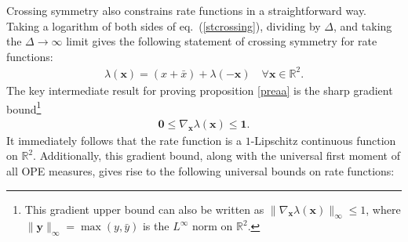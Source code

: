 \documentclass[a4paper,11pt]{article}
\theoremstyle{plain}
\theoremstyle{definition}
\theoremstyle{remark}
\newcommand{\bs}[1]{\boldsymbol{#1}}
\newcommand{\ba}{\begin{equation} \begin{aligned}}
\newcommand{\ea}{\end{aligned} \end{equation}}
\newcommand{\De}{\Delta}
\begin{document}
Crossing symmetry also constrains rate functions in a straightforward way. Taking a logarithm of both sides of eq.~(\ref{stcrossing}), dividing by $\De$, and taking the $\De \to \infty$ limit gives the following statement of crossing symmetry for rate functions:
\ba
\lambda(\bs{x}) = (x+ \bar{x}) + \lambda(-\bs{x}) \quad \forall\bs{x} \in \mathbb{R}^2.
\ea
The key intermediate result for proving proposition \ref{preaa} is the sharp gradient bound\footnote{This gradient upper bound can also be written as $ \| \nabla_{\bs{x}}\lambda(\bs{x})\|_{\infty} \leq1$, where $\|\bs{y}\|_{\infty} = \max(y,\bar{y})$ is the $L^\infty$ norm on $\mathbb{R}^2$.}
\ba
\bs{0}\leq \nabla_{\bs{x}}\lambda(\bs{x}) \leq \bs{1}.
\ea
It immediately follows that the rate function is a $1$-Lipschitz continuous function on $\mathbb{R}^2$. Additionally, this gradient bound, along with the universal first moment of all OPE measures, gives rise to the following universal bounds on rate functions:
\end{document}
